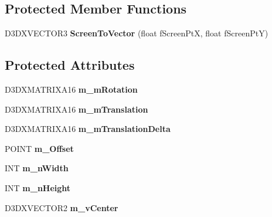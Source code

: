 \subsection*{Protected Member Functions}
\begin{DoxyCompactItemize}
\item 
\hypertarget{class_c_d3_d_arc_ball_a7c1d50c7a090b1b64ea528cddc1858dc}{D3\+D\+X\+V\+E\+C\+T\+O\+R3 {\bfseries Screen\+To\+Vector} (float f\+Screen\+Pt\+X, float f\+Screen\+Pt\+Y)}\label{class_c_d3_d_arc_ball_a7c1d50c7a090b1b64ea528cddc1858dc}

\end{DoxyCompactItemize}
\subsection*{Protected Attributes}
\begin{DoxyCompactItemize}
\item 
\hypertarget{class_c_d3_d_arc_ball_a02619e72fe82db21a3c237a94eb31a37}{D3\+D\+X\+M\+A\+T\+R\+I\+X\+A16 {\bfseries m\+\_\+m\+Rotation}}\label{class_c_d3_d_arc_ball_a02619e72fe82db21a3c237a94eb31a37}

\item 
\hypertarget{class_c_d3_d_arc_ball_a2d9f13c59ac72cec38ab704159b7e4e9}{D3\+D\+X\+M\+A\+T\+R\+I\+X\+A16 {\bfseries m\+\_\+m\+Translation}}\label{class_c_d3_d_arc_ball_a2d9f13c59ac72cec38ab704159b7e4e9}

\item 
\hypertarget{class_c_d3_d_arc_ball_ad630f2a7fc9ca7f77574ba9e9560c672}{D3\+D\+X\+M\+A\+T\+R\+I\+X\+A16 {\bfseries m\+\_\+m\+Translation\+Delta}}\label{class_c_d3_d_arc_ball_ad630f2a7fc9ca7f77574ba9e9560c672}

\item 
\hypertarget{class_c_d3_d_arc_ball_ab6246cc5b63d98a3dfcb4530cae75ef4}{P\+O\+I\+N\+T {\bfseries m\+\_\+\+Offset}}\label{class_c_d3_d_arc_ball_ab6246cc5b63d98a3dfcb4530cae75ef4}

\item 
\hypertarget{class_c_d3_d_arc_ball_a71b658e5247eb150029dfe923bd116c3}{I\+N\+T {\bfseries m\+\_\+n\+Width}}\label{class_c_d3_d_arc_ball_a71b658e5247eb150029dfe923bd116c3}

\item 
\hypertarget{class_c_d3_d_arc_ball_a53bb3eeba4a817148421c5c53b4b846d}{I\+N\+T {\bfseries m\+\_\+n\+Height}}\label{class_c_d3_d_arc_ball_a53bb3eeba4a817148421c5c53b4b846d}

\item 
\hypertarget{class_c_d3_d_arc_ball_a6075b159b5221b3091e32b090c0dcab3}{D3\+D\+X\+V\+E\+C\+T\+O\+R2 {\bfseries m\+\_\+v\+Center}}\label{class_c_d3_d_arc_ball_a6075b159b5221b3091e32b090c0dcab3}


\end{DoxyCompactItemize}
